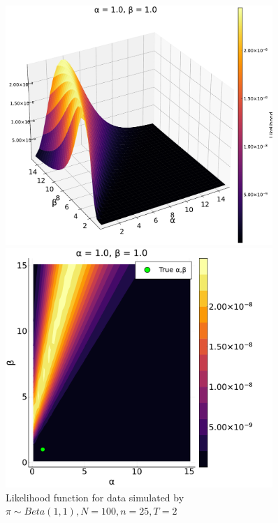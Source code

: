 \documentclass[a4paper, 12pt]{article}
\begin{document}
\begin{figure}
    \centering
    \begin{minipage}{0.55\textwidth}
        \centering
        \includegraphics[width=0.9\textwidth]{../figures/Likelihood_sfplt_2.pdf} %
    \end{minipage}\hfill
    \begin{minipage}{0.45\textwidth}
        \centering
        \includegraphics[width=0.9\textwidth]{../figures/Likelihood_contplt_2.pdf} %
    \end{minipage}
    \caption{\small Likelihood function for data simulated by $\pi \sim Beta(1, 1), N = 100, n = 25, T = 2$}
\end{figure}
\end{document}

